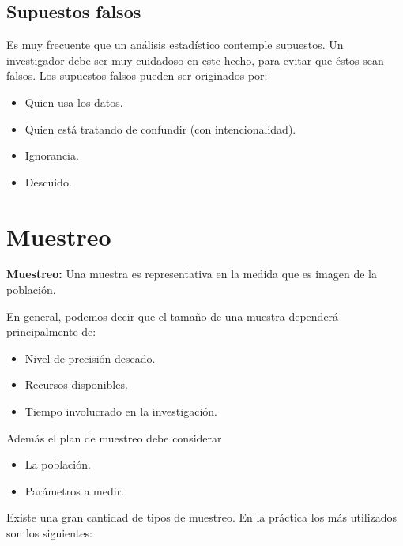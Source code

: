 \subsection{Supuestos falsos}

Es muy frecuente que un an\'alisis estad\'istico contemple supuestos. Un investigador debe ser muy cuidadoso en este hecho, para evitar que \'estos sean falsos. Los supuestos falsos pueden ser originados por:

\begin{itemize}
    \item Quien usa los datos.
    \item Quien est\'a tratando de confundir (con intencionalidad).
    \item Ignorancia.
    \item Descuido.
\end{itemize}

\section{Muestreo}

\textbf{Muestreo:} Una muestra es representativa en la medida que es imagen de la poblaci\'on.

En general, podemos decir que el tama\~no de una muestra depender\'a principalmente de:

\begin{itemize}
    \item Nivel de precisi\'on deseado.
    \item Recursos disponibles.
    \item Tiempo involucrado en la investigaci\'on.
\end{itemize}

Adem\'as el plan de muestreo debe considerar

\begin{itemize}
    \item La poblaci\'on.
    \item Par\'ametros a medir.
\end{itemize}

Existe una gran cantidad de tipos de muestreo. En la pr\'actica los m\'as utilizados son los siguientes:


